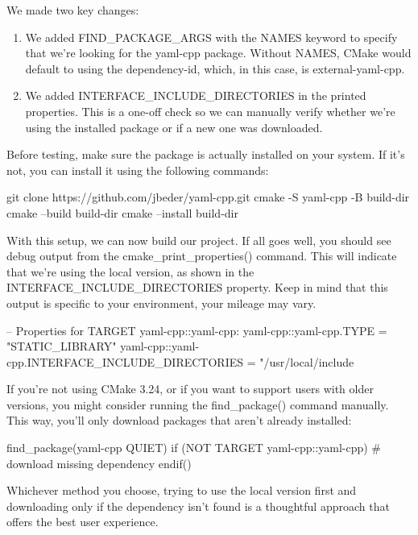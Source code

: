 We made two key changes:

\begin{enumerate}
\item
We added FIND\_PACKAGE\_ARGS with the NAMES keyword to specify that we’re looking for the yaml-cpp package. Without NAMES, CMake would default to using the dependency-id, which, in this case, is external-yaml-cpp.

\item
We added INTERFACE\_INCLUDE\_DIRECTORIES in the printed properties. This is a one-off check so we can manually verify whether we’re using the installed package or if a new one was downloaded.
\end{enumerate}

Before testing, make sure the package is actually installed on your system. If it’s not, you can install it using the following commands:

\begin{shell}
git clone https://github.com/jbeder/yaml-cpp.git
cmake -S yaml-cpp -B build-dir
cmake --build build-dir
cmake --install build-dir
\end{shell}

With this setup, we can now build our project. If all goes well, you should see debug output from the cmake\_print\_properties() command. This will indicate that we’re using the local version, as shown in the INTERFACE\_INCLUDE\_DIRECTORIES property. Keep in mind that this output is specific to your environment, your mileage may vary.

\begin{shell}
--
    Properties for TARGET yaml-cpp::yaml-cpp:
        yaml-cpp::yaml-cpp.TYPE = "STATIC_LIBRARY"
        yaml-cpp::yaml-cpp.INTERFACE_INCLUDE_DIRECTORIES =
                                                    "/usr/local/include
\end{shell}

If you’re not using CMake 3.24, or if you want to support users with older versions, you might consider running the find\_package() command manually. This way, you’ll only download packages that aren’t already installed:

\begin{cmake}
find_package(yaml-cpp QUIET)
if (NOT TARGET yaml-cpp::yaml-cpp)
    # download missing dependency
endif()
\end{cmake}

Whichever method you choose, trying to use the local version first and downloading only if the dependency isn’t found is a thoughtful approach that offers the best user experience.

